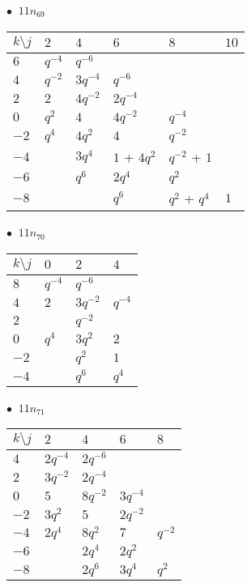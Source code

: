 %
\begin{minipage}{\linewidth}
$\bullet\ $ $11n_{69}$ \vspace{0.5em} \\
\begin{tabular}{l|lllll}
$k \setminus j$ & $2$ & $4$ & $6$ & $8$ & $10$ \\
\hline
$6$ & $q^{-4}$ & $q^{-6}$ &  &  &  \\
$4$ & $q^{-2}$ & $3q^{-4}$ & $q^{-6}$ &  &  \\
$2$ & $2$ & $4q^{-2}$ & $2q^{-4}$ &  &  \\
$0$ & $q^{2}$ & $4$ & $4q^{-2}$ & $q^{-4}$ &  \\
$-2$ & $q^{4}$ & $4q^{2}$ & $4$ & $q^{-2}$ &  \\
$-4$ &  & $3q^{4}$ & $1$ + $4q^{2}$ & $q^{-2}$ + $1$ &  \\
$-6$ &  & $q^{6}$ & $2q^{4}$ & $q^{2}$ &  \\
$-8$ &  &  & $q^{6}$ & $q^{2}$ + $q^{4}$ & $1$ \\
\end{tabular}
\vspace{2em}
\end{minipage}
%
\begin{minipage}{\linewidth}
$\bullet\ $ $11n_{70}$ \vspace{0.5em} \\
\begin{tabular}{l|lll}
$k \setminus j$ & $0$ & $2$ & $4$ \\
\hline
$8$ & $q^{-4}$ & $q^{-6}$ &  \\
$4$ & $2$ & $3q^{-2}$ & $q^{-4}$ \\
$2$ &  & $q^{-2}$ &  \\
$0$ & $q^{4}$ & $3q^{2}$ & $2$ \\
$-2$ &  & $q^{2}$ & $1$ \\
$-4$ &  & $q^{6}$ & $q^{4}$ \\
\end{tabular}
\vspace{2em}
\end{minipage}
%
\begin{minipage}{\linewidth}
$\bullet\ $ $11n_{71}$ \vspace{0.5em} \\
\begin{tabular}{l|llll}
$k \setminus j$ & $2$ & $4$ & $6$ & $8$ \\
\hline
$4$ & $2q^{-4}$ & $2q^{-6}$ &  &  \\
$2$ & $3q^{-2}$ & $2q^{-4}$ &  &  \\
$0$ & $5$ & $8q^{-2}$ & $3q^{-4}$ &  \\
$-2$ & $3q^{2}$ & $5$ & $2q^{-2}$ &  \\
$-4$ & $2q^{4}$ & $8q^{2}$ & $7$ & $q^{-2}$ \\
$-6$ &  & $2q^{4}$ & $2q^{2}$ &  \\
$-8$ &  & $2q^{6}$ & $3q^{4}$ & $q^{2}$ \\
\end{tabular}
\vspace{2em}
\end{minipage}

